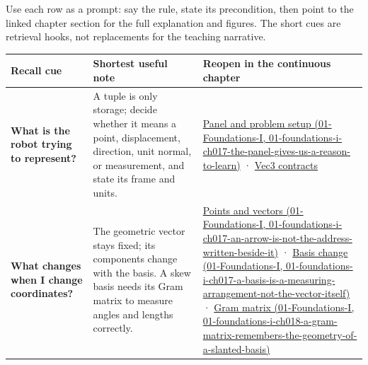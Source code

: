Use each row as a prompt: say the rule, state its precondition, then point to the linked chapter section for the full explanation and figures. The short cues are retrieval hooks, not replacements for the teaching narrative.

{\def\LTcaptype{none} %
\begin{longtable}[]{@{}
  >{\raggedright\arraybackslash}p{}
  >{\raggedright\arraybackslash}p{}
  >{\raggedright\arraybackslash}p{}@{}}
\toprule\noalign{}
\begin{minipage}[b]{\linewidth}\raggedright
Recall cue
\end{minipage} & \begin{minipage}[b]{\linewidth}\raggedright
Shortest useful note
\end{minipage} & \begin{minipage}[b]{\linewidth}\raggedright
Reopen in the continuous chapter
\end{minipage} \\
\midrule\noalign{}
\endhead
\bottomrule\noalign{}
\endlastfoot
\textbf{What is the robot trying to represent?} & A tuple is only storage; decide whether it means a point, displacement, direction, unit normal, or measurement, and state its frame and units. & \href{../01-Foundations-I/main.pdf\#nameddest=01-foundations-i-ch017-the-panel-gives-us-a-reason-to-learn}{Panel and problem setup (01-Foundations-I, 01-foundations-i-ch017-the-panel-gives-us-a-reason-to-learn)} · \hyperref[02-foundations-ii-ch037-three-stored-numbers-are-not-the-complete-contract]{Vec3 contracts} \\
\textbf{What changes when I change coordinates?} & The geometric vector stays fixed; its components change with the basis. A skew basis needs its Gram matrix to measure angles and lengths correctly. & \href{../01-Foundations-I/main.pdf\#nameddest=01-foundations-i-ch017-an-arrow-is-not-the-address-written-beside-it}{Points and vectors (01-Foundations-I, 01-foundations-i-ch017-an-arrow-is-not-the-address-written-beside-it)} · \href{../01-Foundations-I/main.pdf\#nameddest=01-foundations-i-ch017-a-basis-is-a-measuring-arrangement-not-the-vector-itself}{Basis change (01-Foundations-I, 01-foundations-i-ch017-a-basis-is-a-measuring-arrangement-not-the-vector-itself)} · \href{../01-Foundations-I/main.pdf\#nameddest=01-foundations-i-ch018-a-gram-matrix-remembers-the-geometry-of-a-slanted-basis}{Gram matrix (01-Foundations-I, 01-foundations-i-ch018-a-gram-matrix-remembers-the-geometry-of-a-slanted-basis)} \\

\end{longtable}}
